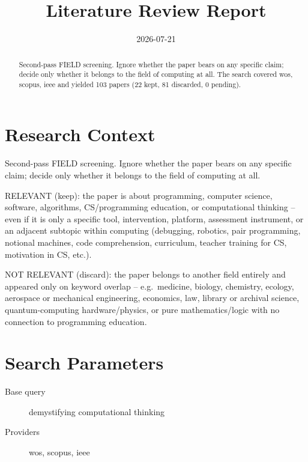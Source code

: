 \documentclass{article}
\title{Literature Review Report}
\date{2026-07-21}
\begin{document}
\maketitle

\begin{abstract}
Second-pass FIELD screening. Ignore whether the paper bears on any specific claim; decide only whether it belongs to the field of computing at all. The search covered wos, scopus, ieee and yielded 103 papers (22 kept, 81 discarded, 0 pending).
\end{abstract}
\clearpage
\clearpage
\tableofcontents
\clearpage

\section{Research Context}
Second-pass FIELD screening. Ignore whether the paper bears on any
specific claim; decide only whether it belongs to the field of computing
at all.

RELEVANT (keep): the paper is about programming, computer science,
software, algorithms, CS/programming education, or computational
thinking -- even if it is only a specific tool, intervention, platform,
assessment instrument, or an adjacent subtopic within computing
(debugging, robotics, pair programming, notional machines, code
comprehension, curriculum, teacher training for CS, motivation in CS,
etc.).

NOT RELEVANT (discard): the paper belongs to another field entirely and
appeared only on keyword overlap -- e.g.~medicine, biology, chemistry,
ecology, aerospace or mechanical engineering, economics, law, library or
archival science, quantum-computing hardware/physics, or pure
mathematics/logic with no connection to programming education.

\section{Search Parameters}

\begin{description}
\item[Base query] demystifying computational thinking
\item[Providers] wos, scopus, ieee
\end{description}
\end{document}
